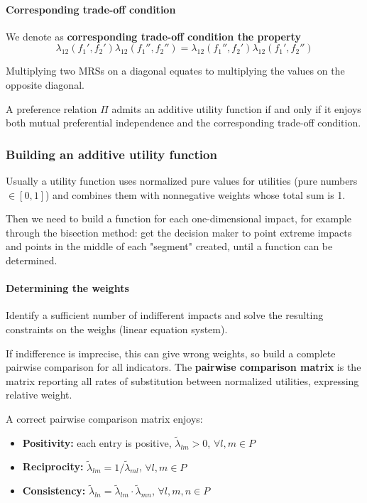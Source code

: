 \paragraph{Corresponding trade-off condition} We denote as \textbf{corresponding trade-off condition the property}
$$ \lambda_{12} (f_1', f_2') \lambda_{12} (f_1'', f_2'') = \lambda_{12} (f_1'', f_2') \lambda_{12} (f_1', f_2'')$$

Multiplying two MRSs on a diagonal equates to multiplying the values on the opposite diagonal.

A preference relation $\Pi$ admits an additive utility function if and only if it enjoys both mutual preferential independence and the corresponding trade-off condition.

\subsubsection{Building an additive utility function}

Usually a utility function uses normalized pure values for utilities (pure numbers $\in [0,1]$) and combines them with nonnegative weights whose total sum is 1. 

Then we need to build a function for each one-dimensional impact, for example through the bisection method: get the decision maker to point extreme impacts and points in the middle of each "segment" created, until a function can be determined.

\paragraph{Determining the weights} Identify a sufficient number of indifferent impacts and solve the resulting constraints on the weighs (linear equation system).

If indifference is imprecise, this can give wrong weights, so build a complete pairwise comparison for all indicators. The \textbf{pairwise comparison matrix} is the matrix reporting all rates of substitution between normalized utilities, expressing relative weight. 

A correct pairwise comparison matrix enjoys: 
\begin{itemize}
	\item \textbf{Positivity:} each entry is positive, $\tilde \lambda_{lm} > 0$, $\forall l,m \in P$
	
	\item \textbf{Reciprocity:} $\tilde \lambda_{lm} = 1/ \tilde \lambda_{ml}$, $\forall l,m \in P$
	
	\item \textbf{Consistency:} $\tilde \lambda_{ln} = \tilde \lambda_{lm} \cdot \tilde \lambda_{mn}$, $\forall l,m,n \in P$
\end{itemize}

